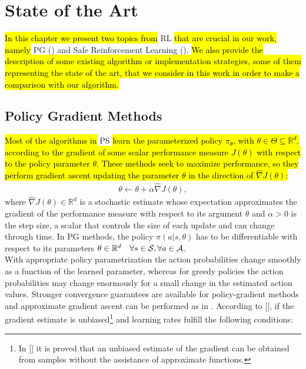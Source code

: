 \chapter{State of the Art} \label{chap:state}
\hl{In this chapter we present two topics from} \ac{RL} \hl{that are crucial in our work, namely} \acf{PG} () and Safe Reinforcement Learning (). \hl{We also provide the description of some existing algorithm or implementation strategies, some of them representing the state of the art, that we consider in this work in order to make a comparison with our algorithm.}

\section{Policy Gradient Methods} \label{sec:pg}
\hl{Most of the algorithms in} \ac{PS} \hl{learn the parameterized policy $\pi_{\theta}$, with $\theta \in \Theta \subseteq \mathbb{R}^d$, according to the gradient of some scalar performance measure $J(\theta)$ with respect to the policy parameter $\theta$. These methods seek to maximize performance, so they perform gradient ascent updating the parameter $\theta$ in the direction of $\widehat{\nabla}J(\theta)$:}
\begin{align}
\theta \leftarrow \theta + \alpha \widehat{\nabla}J(\theta), \label{eq:grad}
\end{align}
where $\widehat{\nabla}J(\theta) \in \mathbb{R}^d$ is a stochastic estimate whose expectation approximates the gradient of the performance measure with respect to its argument $\theta$ and $\alpha>0$ is the step size, a scalar that controls the size of each update and can change through time. In \ac{PG} methods, the policy $\pi(a|s,\theta)$ has to be differentiable with respect to its parameters $\theta \in \mathbb{R}^d \quad \forall s \in \mathcal{S}, \forall a \in \mathcal{A}$.\\
\newline
With appropriate policy parametrization the action probabilities change smoothly as a function of the learned parameter, whereas for greedy policies the action probabilities may change enormously for a small change in the estimated action values. Stronger convergence guarantees are available for policy-gradient methods and approximate gradient ascent can be performed as in . According to [\cite{peters2010pg}], if the gradient estimate is unbiased\footnote{In [\cite{williams1992simple}] it is proved that an unbiased estimate of the gradient can be obtained from samples without the assistance of approximate functions.} and learning rates fulfill the following conditions:
